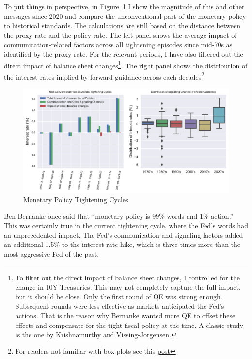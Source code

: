 \documentclass[
  letterpaper,
  DIV=11,
  numbers=noendperiod]{scrartcl}
\begin{document}
To put things in perspective, in Figure~\ref{fig-3} I show the magnitude
of this and other messages since 2020 and compare the unconventional
part of the monetary policy to historical standards. The calculations
are still based on the distance between the proxy rate and the policy
rate. The left panel shows the average impact of communication-related
factors across all tightening episodes since mid-70s as identified by
the proxy rate. For the relevant periods, I have also filtered out the
direct impact of balance sheet changes\footnote{To filter out the direct
  impact of balance sheet changes, I controlled for the change in 10Y
  Treasuries. This may not completely capture the full impact, but it
  should be close. Only the first round of QE was strong enough.
  Subsequent rounds were less effective as markets anticipated the Fed's
  actions. That is the reason why Bernanke wanted more QE to offset
  these effects and compensate for the tight fiscal policy at the time.
  A classic study is the one by
  \href{https://www.nber.org/papers/w17555}{Krishnamurthy and
  Vissing-Jorgensen}.}. The right panel shows the distribution of the
interest rates implied by forward guidance across each
decades\footnote{For readers not familiar with box plots see this
  \href{https://en.wikipedia.org/wiki/Box_plot}{post}}.

\begin{figure}

{\centering \includegraphics{Hawkish_Fed_files/figure-pdf/fig-3-output-1.pdf}

}

\caption{\label{fig-3}Monetary Policy Tightening Cycles}

\end{figure}

Ben Bernanke once said that ``monetary policy is 99\% words and 1\%
action.'' This was certainly true in the current tightening cycle, where
the Fed's words had an unprecedented impact. The Fed's communication and
signaling factors added an additional 1.5\% to the interest rate hike,
which is three times more than the most aggressive Fed of the past.
\end{document}
